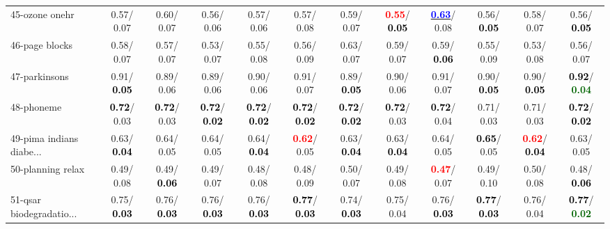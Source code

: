 \begin{table}[h]
\begin{center}
{\begin{tabular}{lc|c|c|c|c|c|c|c|c|c|c}
45-ozone onehr &   0.57/  0.07 &   0.60/  0.07 &   0.56/  0.06 &   0.57/  0.06 &   0.57/  0.08 &   0.59/  0.07 & \textcolor{red}{\textbf{  0.55}}/\textcolor{black}{\textbf{  0.05}} & \underline{\textcolor{blue}{\textbf{  0.63}}}/  0.08 &   0.56/\textcolor{black}{\textbf{  0.05}} &   0.58/  0.07 &   0.56/\textcolor{black}{\textbf{  0.05}} \\
46-page blocks &   0.58/  0.07 &   0.57/  0.07 &   0.53/  0.07 &   0.55/  0.08 &   0.56/  0.09 &   0.63/  0.07 &   0.59/  0.07 &   0.59/\textcolor{black}{\textbf{  0.06}} &   0.55/  0.09 &   0.53/  0.08 &   0.56/  0.07 \\ \hline
47-parkinsons &   0.91/\textcolor{black}{\textbf{  0.05}} &   0.89/  0.06 &   0.89/  0.06 &   0.90/  0.06 &   0.91/  0.07 &   0.89/\textcolor{black}{\textbf{  0.05}} &   0.90/  0.06 &   0.91/  0.07 &   0.90/\textcolor{black}{\textbf{  0.05}} &   0.90/\textcolor{black}{\textbf{  0.05}} & \textcolor{black}{\textbf{  0.92}}/\textcolor{darkgreen}{\textbf{  0.04}} \\
48-phoneme & \textcolor{black}{\textbf{  0.72}}/  0.03 & \textcolor{black}{\textbf{  0.72}}/  0.03 & \textcolor{black}{\textbf{  0.72}}/\textcolor{black}{\textbf{  0.02}} & \textcolor{black}{\textbf{  0.72}}/\textcolor{black}{\textbf{  0.02}} & \textcolor{black}{\textbf{  0.72}}/\textcolor{black}{\textbf{  0.02}} & \textcolor{black}{\textbf{  0.72}}/\textcolor{black}{\textbf{  0.02}} & \textcolor{black}{\textbf{  0.72}}/  0.03 & \textcolor{black}{\textbf{  0.72}}/  0.04 &   0.71/  0.03 &   0.71/  0.03 & \textcolor{black}{\textbf{  0.72}}/\textcolor{black}{\textbf{  0.02}} \\
49-pima indians diabe... &   0.63/\textcolor{black}{\textbf{  0.04}} &   0.64/  0.05 &   0.64/  0.05 &   0.64/\textcolor{black}{\textbf{  0.04}} & \textcolor{red}{\textbf{  0.62}}/  0.05 &   0.63/\textcolor{black}{\textbf{  0.04}} &   0.63/\textcolor{black}{\textbf{  0.04}} &   0.64/  0.05 & \textcolor{black}{\textbf{  0.65}}/  0.05 & \textcolor{red}{\textbf{  0.62}}/\textcolor{black}{\textbf{  0.04}} &   0.63/  0.05 \\
50-planning relax &   0.49/  0.08 &   0.49/\textcolor{black}{\textbf{  0.06}} &   0.49/  0.07 &   0.48/  0.08 &   0.48/  0.09 &   0.50/  0.07 &   0.49/  0.08 & \textcolor{red}{\textbf{  0.47}}/  0.07 &   0.49/  0.10 &   0.50/  0.08 &   0.48/\textcolor{black}{\textbf{  0.06}} \\
51-qsar biodegradatio... &   0.75/\textcolor{black}{\textbf{  0.03}} &   0.76/\textcolor{black}{\textbf{  0.03}} &   0.76/\textcolor{black}{\textbf{  0.03}} &   0.76/\textcolor{black}{\textbf{  0.03}} & \textcolor{black}{\textbf{  0.77}}/\textcolor{black}{\textbf{  0.03}} &   0.74/\textcolor{black}{\textbf{  0.03}} &   0.75/  0.04 &   0.76/\textcolor{black}{\textbf{  0.03}} & \textcolor{black}{\textbf{  0.77}}/\textcolor{black}{\textbf{  0.03}} &   0.76/  0.04 & \textcolor{black}{\textbf{  0.77}}/\textcolor{darkgreen}{\textbf{  0.02}} \\

\end{tabular}}
\end{center}
\end{table}
